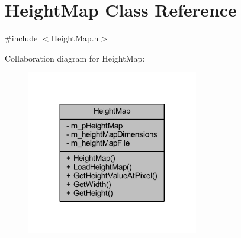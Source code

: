 \hypertarget{class_height_map}{}\section{Height\+Map Class Reference}
\label{class_height_map}


{\ttfamily \#include $<$Height\+Map.\+h$>$}



Collaboration diagram for Height\+Map\+:\nopagebreak
\begin{figure}[H]
\begin{center}
\leavevmode
\includegraphics[width=212pt]{class_height_map__coll__graph}
\end{center}
\end{figure}
